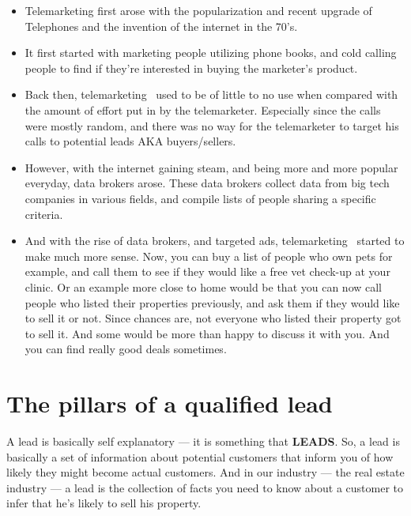 \documentclass[12pt]{article}
\newcommand{\tm}[0]{telemarketing }
\begin{document}
\begin{itemize}
    \item Telemarketing first arose with the popularization and recent upgrade of Telephones and the invention of the internet in the 70's. 

    \item It first started with marketing people utilizing phone books, and cold calling people to find if they're interested in buying the marketer's product.

    \item Back then, \tm\ used to be of little to no use when compared with the amount of effort put in by the telemarketer. Especially since the calls were mostly random, and there was no way for the telemarketer to target his calls to potential leads AKA buyers/sellers. 

    \item However, with the internet gaining steam, and being more and more popular everyday, data brokers arose. These data brokers collect data from big tech companies in various fields, and compile lists of people sharing a specific criteria.

    \item And with the rise of data brokers, and targeted ads, \tm\ started to make much more sense. Now, you can buy a list of people who own pets for example, and call them to see if they would like a free vet check-up at your clinic. Or an example more close to home would be that you can now call people who listed their properties previously, and ask them if they would like to sell it or not. Since chances are, not everyone who listed their property got to sell it. And some would be more than happy to discuss it with you. And you can find really good deals sometimes.
    
\end{itemize}


\newpage
{}
\pagestyle{fancy}

\section{The pillars of a qualified lead}
A lead is basically self explanatory --- it is something that \textbf{LEADS}. So, a lead is basically a set of information about potential customers that inform you of how likely they might become actual customers. And in our industry --- the real estate industry --- a lead is the collection of facts you need to know about a customer to infer that he's likely to sell his property.
\end{document}
